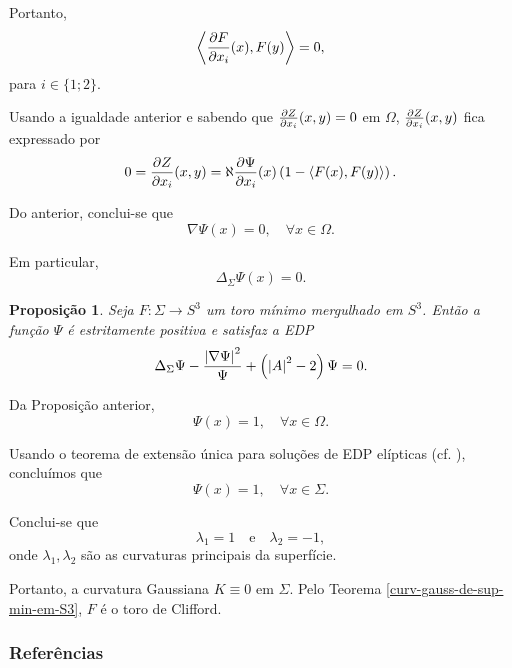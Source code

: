 \documentclass[12pt,a4paper]{beamer}
\newtheorem{proposicao}{Proposição}
\theoremstyle{definition}
\begin{document}
\begin{frame}
	Portanto, 
	\begin{equation*}
		\left\langle \frac{\partial F}{\partial x_i}(x),F(y) \right\rangle = 0,
	\end{equation*}
	para $i \in \{1;2\}$.
	
	Usando a igualdade anterior e sabendo que $\frac{\partial Z}{\partial x_i}(x,y)=0$ em $\Omega$, $\frac{\partial Z}{\partial x_i}(x,y)$ fica expressado por
	\begin{equation*}
		0 = \frac{\partial Z}{\partial x_i}(x,y) = \aleph \frac{\partial \Psi}{\partial x_i}(x) \left( 1 - \left\langle F(x),F(y) \right\rangle \right).
	\end{equation*}
\end{frame}

\begin{frame}
	Do anterior, conclui-se que
	\begin{equation*}
		\nabla \Psi(x) = 0, \quad \forall x \in \Omega.
	\end{equation*}
	
	Em particular,
	\begin{equation*}
		\Delta_{\Sigma} \Psi(x) = 0.
	\end{equation*}
\end{frame}

\begin{frame}
	\begin{proposicao}
		Seja $F: \Sigma \rightarrow S^3$ um toro mínimo mergulhado em $S^3$. Então a função $\Psi$ é estritamente positiva e satisfaz a EDP
		\begin{equation*}
			\Delta_{\Sigma} \Psi - \frac{\left| \nabla \Psi \right|^2}{\Psi} + \left( \left| A \right|^2 - 2 \right) \Psi = 0.
		\end{equation*}
	\end{proposicao}
\end{frame}

\begin{frame}
	Da Proposição anterior,
	\[ \Psi(x) = 1, \quad \forall x \in \Omega. \]
	
	Usando o teorema de extensão única para soluções de EDP elípticas (cf. \cite{Aronszajn1957}), concluímos que
	\[ \Psi(x) = 1, \quad \forall x \in \Sigma. \]
	
	Conclui-se que
	\[ \lambda_1 = 1 \quad \text{e} \quad \lambda_2 = -1, \]
	onde $\lambda_1,\lambda_2$ são as curvaturas principais da superfície.
\end{frame}

\begin{frame}
	Portanto, a curvatura Gaussiana $K \equiv 0$ em $\Sigma$. Pelo Teorema \ref{curv-gauss-de-sup-min-em-S3}, $F$ é o toro de Clifford.
\end{frame}

\begin{frame}[allowframebreaks]
	\frametitle{Referências}
	
\end{frame}
\end{document}
